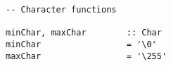 \begin{verbatim}
-- Character functions

minChar, maxChar        :: Char
minChar                 = '\0'
maxChar                 = '\255'
\end{verbatim}